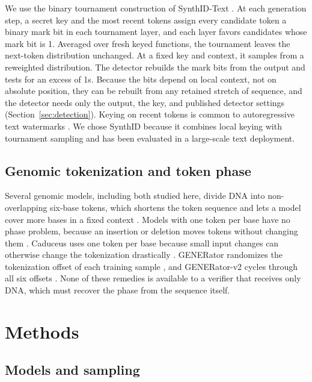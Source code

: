 \documentclass[10pt,twocolumn]{article}
\begin{document}
We use the binary tournament construction of SynthID-Text \cite{dathathri2024scalable}. At each
generation step, a secret key and the most recent tokens assign every candidate token a binary
mark bit in each tournament layer, and each layer favors candidates whose mark bit is 1. Averaged
over fresh keyed functions, the tournament leaves the next-token distribution unchanged. At a
fixed key and context, it samples from a reweighted distribution. The detector rebuilds the mark
bits from the output and tests for an excess of 1s. Because the bits depend on local context, not
on absolute position, they can be rebuilt from any retained stretch of sequence, and the detector
needs only the output, the key, and published detector settings
(Section~\ref{sec:detection}). Keying on recent tokens is common to
autoregressive text watermarks \cite{kirchenbauer2023watermark}. We chose SynthID because it
combines local keying with tournament sampling and has been evaluated in a large-scale text
deployment.

\subsection{Genomic tokenization and token phase}

Several genomic models, including both studied here, divide DNA into non-overlapping six-base
tokens, which shortens the token sequence and lets a model cover more bases in a fixed context
\cite{dallatorre2025nucleotide,wu2025generator,carbon2026,generatorv22026}. Models with one token
per base have no phase problem, because an insertion or deletion moves tokens without changing them
\cite{nguyen2024evo,nguyen2023hyenadna}. Caduceus uses one token per base because small input
changes can otherwise change the tokenization drastically \cite{schiff2024caduceus}. GENERator
randomizes the tokenization offset of each training sample \cite{wu2025generator}, and
GENERator-v2 cycles through all six offsets \cite{generatorv22026}. None of these remedies is
available to a verifier that receives only DNA, which must recover the phase from the sequence
itself.

\section{Methods}
\label{sec:methods}

\subsection{Models and sampling}
\end{document}
